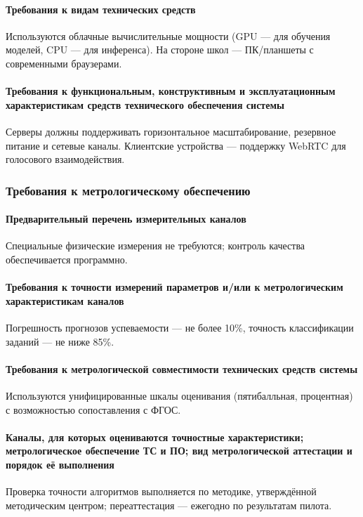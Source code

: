\documentclass[14pt,a4paper]{extarticle}
\begin{document}
\paragraph{Требования к видам технических средств} Используются облачные вычислительные мощности (GPU — для обучения моделей, CPU — для инференса). На стороне школ — ПК/планшеты с современными браузерами.
\paragraph{Требования к функциональным, конструктивным и эксплуатационным характеристикам средств технического обеспечения системы} Серверы должны поддерживать горизонтальное масштабирование, резервное питание и сетевые каналы. Клиентские устройства — поддержку WebRTC для голосового взаимодействия.

\subsubsection{Требования к метрологическому обеспечению}
\paragraph{Предварительный перечень измерительных каналов} Специальные физические измерения не требуются; контроль качества обеспечивается программно.
\paragraph{Требования к точности измерений параметров и/или к метрологическим характеристикам каналов} Погрешность прогнозов успеваемости — не более 10\%, точность классификации заданий — не ниже 85\%.
\paragraph{Требования к метрологической совместимости технических средств системы} Используются унифицированные шкалы оценивания (пятибалльная, процентная) с возможностью сопоставления с ФГОС.
\paragraph{Каналы, для которых оцениваются точностные характеристики; метрологическое обеспечение ТС и ПО; вид метрологической аттестации и порядок её выполнения} Проверка точности алгоритмов выполняется по методике, утверждённой методическим центром; переаттестация — ежегодно по результатам пилота.
\end{document}
